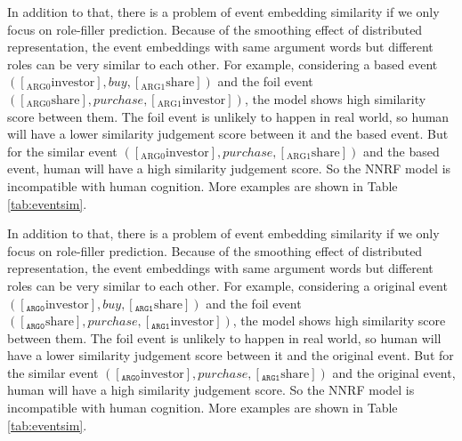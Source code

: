 \documentclass[a4paper]{article}
\begin{document}
In addition to that, there is a problem of event embedding similarity if we only focus on role-filler prediction. Because of the smoothing effect of distributed representation, the event embeddings with same argument words but different roles can be very similar to each other. For example, considering a based event $([_{\text{ARG0}} \text{investor}], buy, [_{\text{ARG1}}\text{share}])$ and the foil event $([_{\text{ARG0}}\text{share}], purchase, [_{\text{ARG1}}\text{investor}])$, the model shows high similarity score between them. The foil event is unlikely to happen in real world, so human will have a lower similarity judgement score between it and the based event. But for the similar event $([_{\text{ARG0}}\text{investor}], purchase, [_{\text{ARG1}}\text{share}])$ and the based event, human will have a high similarity judgement score. So the NNRF model is incompatible with human cognition. More examples are shown in Table \ref{tab:eventsim}. 
% 
% 
% 
% 
% 
%

In addition to that, there is a problem of event embedding similarity if we only focus on role-filler prediction. Because of the smoothing effect of distributed representation, the event embeddings with same argument words but different roles can be very similar to each other. For example, considering a original event $([_{\texttt{ARG0}} \text{investor}], buy, [_{\texttt{ARG1}}\text{share}])$ and the foil event $([_{\texttt{ARG0}}\text{share}], purchase, [_{\texttt{ARG1}}\text{investor}])$, the model shows high similarity score between them. The foil event is unlikely to happen in real world, so human will have a lower similarity judgement score between it and the original event. But for the similar event $([_{\texttt{ARG0}}\text{investor}], purchase, [_{\texttt{ARG1}}\text{share}])$ and the original event, human will have a high similarity judgement score. So the NNRF model is incompatible with human cognition. More examples are shown in Table \ref{tab:eventsim}. 
% 
% 
% 
%
\end{document}
